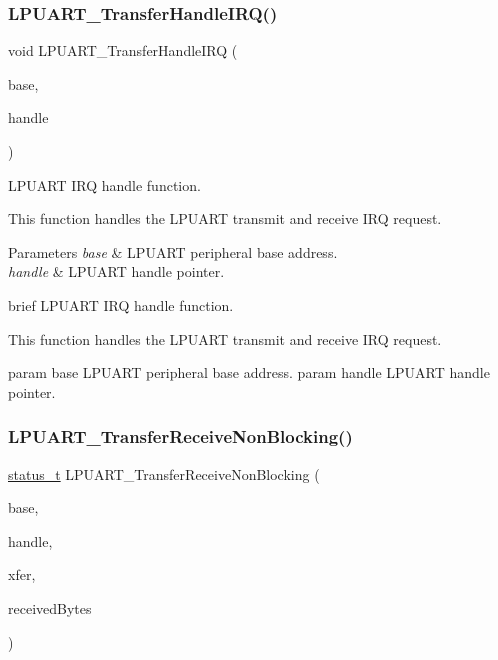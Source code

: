 \subsubsection{\texorpdfstring{LPUART\_TransferHandleIRQ()}{LPUART\_TransferHandleIRQ()}}
{\footnotesize\ttfamily void L\+P\+U\+A\+R\+T\+\_\+\+Transfer\+Handle\+I\+RQ (\begin{DoxyParamCaption}\item[{\mbox{\hyperlink{struct_l_p_u_a_r_t___type}{L\+P\+U\+A\+R\+T\+\_\+\+Type}} $\ast$}]{base,  }\item[{\mbox{\hyperlink{struct__lpuart__handle}{lpuart\+\_\+handle\+\_\+t}} $\ast$}]{handle }\end{DoxyParamCaption})}



L\+P\+U\+A\+RT I\+RQ handle function. 

This function handles the L\+P\+U\+A\+RT transmit and receive I\+RQ request.


\begin{DoxyParams}{Parameters}
{\em base} & L\+P\+U\+A\+RT peripheral base address. \\
\hline
{\em handle} & L\+P\+U\+A\+RT handle pointer.\\
\hline
\end{DoxyParams}
brief L\+P\+U\+A\+RT I\+RQ handle function.

This function handles the L\+P\+U\+A\+RT transmit and receive I\+RQ request.

param base L\+P\+U\+A\+RT peripheral base address. param handle L\+P\+U\+A\+RT handle pointer. \mbox{\label{group__lpuart__driver_ga8bdb584704ce7955004751e32627f918}} 
\subsubsection{\texorpdfstring{LPUART\_TransferReceiveNonBlocking()}{LPUART\_TransferReceiveNonBlocking()}}
{\footnotesize\ttfamily \mbox{\hyperlink{group__ksdk__common_gaaabdaf7ee58ca7269bd4bf24efcde092}{status\+\_\+t}} L\+P\+U\+A\+R\+T\+\_\+\+Transfer\+Receive\+Non\+Blocking (\begin{DoxyParamCaption}\item[{\mbox{\hyperlink{struct_l_p_u_a_r_t___type}{L\+P\+U\+A\+R\+T\+\_\+\+Type}} $\ast$}]{base,  }\item[{\mbox{\hyperlink{struct__lpuart__handle}{lpuart\+\_\+handle\+\_\+t}} $\ast$}]{handle,  }\item[{\mbox{\hyperlink{group__lpuart__driver_ga1d4707ebc5d49dd655eedb7e5acd27fd}{lpuart\+\_\+transfer\+\_\+t}} $\ast$}]{xfer,  }\item[{size\+\_\+t $\ast$}]{received\+Bytes }\end{DoxyParamCaption})}



